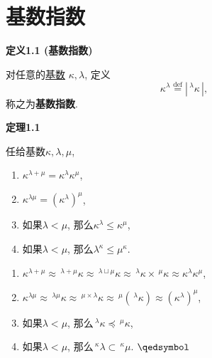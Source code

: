 \documentclass[UTF8]{ctexart}
\begin{document}
\setlength{\abovedisplayskip}{1pt}
\setlength{\belowdisplayskip}{1pt}

\section{基数指数}

\hypertarget{sec:定义1.1}{}
\noindent\textbf{定义1.1 (基数指数)}

对任意的\href{../01 基数/01 基数#nameddest=sec:定义1.1}{基数}
$\kappa,\lambda$, 定义
\[
    \kappa^\lambda\overset{\mathrm{def}}{=}|\,^\lambda\kappa\,|,
\]
称之为\textbf{基数指数}.


\vspace{10pt}

\hypertarget{sec:定理1.1}{}
\noindent\textbf{定理1.1}

任给基数$\kappa,\lambda,\mu$,
\begin{enumerate}
    \item $\kappa^{\lambda+\mu}=\kappa^\lambda\kappa^\mu$,
    \item $\kappa^{\lambda\mu}=(\kappa^\lambda)^\mu$,
    \item 如果$\lambda<\mu$, 那么$\kappa^\lambda\leqslant\kappa^\mu$,
    \item 如果$\lambda<\mu$, 那么$\lambda^\kappa\leqslant\mu^\kappa$.
\end{enumerate}


\begin{enumerate}
    \item $\kappa^{\lambda+\mu}\approx\,\!^{\lambda+\mu}\kappa\approx
    \,\!^{\lambda\sqcup\mu}\kappa\approx
    \,\!^\lambda\kappa\times\,\!^\mu\kappa\approx\kappa^\lambda\kappa^\mu$,
    \item $\kappa^{\lambda\mu}\approx\,\!^{\lambda\mu}\kappa\approx
    \,\!^{\mu\times\lambda}\kappa\approx
    \,\!^\mu(\,\!^\lambda\kappa)\approx(\kappa^\lambda)^\mu$,
    \item 如果$\lambda<\mu$, 那么$\,\!^\lambda\kappa\preccurlyeq\,\!^\mu\kappa$,
    \item 如果$\lambda<\mu$, 那么$\,\!^\kappa\lambda\subset\,\!^\kappa\mu$.
    \hfill $\qedsymbol$
\end{enumerate}

\vspace{10pt}
\end{document}
